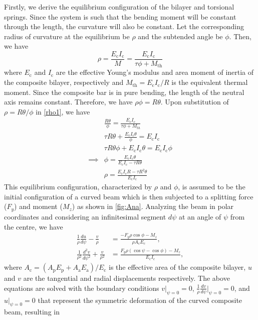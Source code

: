 \documentclass[final,times,5p]{elsarticle}
\numberwithin{equation}{section}
\begin{document}
Firstly, we derive the equilibrium configuration of the bilayer and torsional springs. Since the system is such that the bending moment will be constant through the length, the curvature will also be constant. Let the corresponding radius of curvature at the equilibrium be $\rho$ and the subtended angle be $\phi$. Then, we have
\begin{equation} \label{rho1}
    \rho = \frac{E_\mathrm{c} I_\mathrm{c}}{M}=\frac{E_\mathrm{c} I_\mathrm{c}}{\tau \phi + M_\mathrm{th}}        
\end{equation}
where $E_\mathrm{c}$ and $I_\mathrm{c}$ are the effective Young's modulus and area moment of inertia of the composite bilayer, respectively and $M_\mathrm{th} = E_\mathrm{c} I_\mathrm{c}/R$ is the equivalent thermal moment. Since the composite bar is in pure bending, the length of the neutral axis remains constant. Therefore, we have $\rho \phi = R \theta$. Upon substitution of $\rho={R\theta}/{\phi}$ in \cref{rho1}, we have
\begin{align} 
    &\frac{R\theta}{\phi} =\frac{E_\mathrm{c} I_\mathrm{c}}{\tau \phi + M_{th}} \\
    &\tau R\theta + \frac{E_\mathrm{c} I_\mathrm{c}\theta}{\phi} =E_\mathrm{c} I_\mathrm{c}\\
    &\tau R\theta \phi + E_\mathrm{c} I_\mathrm{c}\theta = E_\mathrm{c} I_\mathrm{c}\phi \\
    \implies &\phi = \frac{E_\mathrm{c} I_\mathrm{c}\theta}{E_\mathrm{c} I_\mathrm{c} - \tau R\theta}\\
    &\rho = \frac{E_\mathrm{c} I_\mathrm{c} R - \tau R^2 \theta}{E_\mathrm{c} I_\mathrm{c}} \label{eqn:eqConf}
\end{align}
This equilibrium configuration, characterized by $\rho$ and $\phi$, is assumed to be the initial configuration of a curved beam which is then subjected to a splitting force ($F_y$) and moment ($M_z$) as shown in \cref{fig:Ana}. Analyzing the beam in polar coordinates and considering an infinitesimal segment $d\psi$ at an angle of $\psi$ from the centre, we have \cite{oden1982mechanics}
\begin{align}
    \frac{1}{\rho} \frac{du}{d\psi}-\frac{v}{\rho}&=\frac{-F_y \rho\cos\phi-M_z}{\rho A_\mathrm{c}E_\mathrm{c}},  \label{eqn:u}\\
    \frac{1}{\rho^2} \frac{d^2v}{d\psi^2}+\frac{v}{\rho^2}&=\frac{F_y\rho(\cos{\psi}-\cos\phi)-M_z}{E_\mathrm{c}I_\mathrm{c}} \label{eqn:v},
\end{align}
where $A_\mathrm{c}=(A_\mathrm{p}E_\mathrm{p}+A_\mathrm{a}E_\mathrm{a})/E_\mathrm{c}$ is the effective area of the composite bilayer, $u$ and $v$ are the tangential and radial displacements respectively. The above equations are solved with the boundary conditions $v|_{\psi=0}=0$, $\frac{1}{\rho} \frac{dv}{d\psi}\bigg|_{\psi=0}=0$, and $u|_{\psi=0}=0$ that represent the symmetric deformation of the curved composite beam, resulting in
\end{document}
